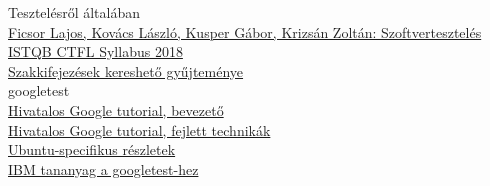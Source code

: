 \documentclass[usenames,dvipsnames,aspectratio=169]{beamer}
\newcommand{\hiv}[1]{{\color{hivatkozasszin}#1}}
\begin{document}
\begin{frame}
  Tesztelésről általában\\
  \hiv{\href{https://www.tankonyvtar.hu/hu/tartalom/tamop425/0046\_szoftverteszteles/index.html}%
  {Ficsor Lajos, Kovács László, Kusper Gábor, Krizsán Zoltán: Szoftvertesztelés}}\\
  \hiv{\href{https://hstqb.org/downloadarea/istqb-ctfl-syllabus-2018-magyar/}{ISTQB CTFL Syllabus 2018}}\\
  \hiv{\href{https://glossary.istqb.org/en/search/}{Szakkifejezések kereshető gyűjteménye}}\\
  \vfill
  googletest\\
  \hiv{\href{https://github.com/google/googletest/blob/master/googletest/docs/primer.md}%
    {Hivatalos Google tutorial, bevezető}}\\
  \hiv{\href{https://github.com/google/googletest/blob/master/googletest/docs/advanced.md}%
    {Hivatalos Google tutorial, fejlett technikák}}\\
  \hiv{\href{https://www.eriksmistad.no/getting-started-with-google-test-on-ubuntu/}%
    {Ubuntu-specifikus részletek}}\\
  \hiv{\href{https://developer.ibm.com/articles/au-googletestingframework/}{IBM tananyag a googletest-hez}}\\
\end{frame}
\end{document}

